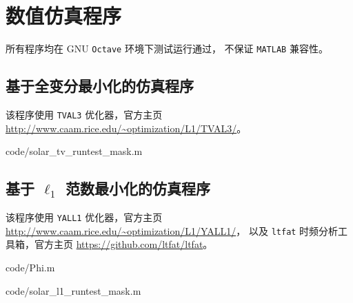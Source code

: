 \chapter{数值仿真程序}

所有程序均在 GNU \verb|Octave| 环境下测试运行通过，
不保证 \verb|MATLAB| 兼容性。

\section{基于全变分最小化的仿真程序}

该程序使用 \verb|TVAL3| 优化器，官方主页
\url{http://www.caam.rice.edu/~optimization/L1/TVAL3/}。

\lstset{basicstyle=\ttfamily}


{code/solar_tv_runtest_mask.m}

\section{基于 $\ell_1$ 范数最小化的仿真程序}

该程序使用 \verb|YALL1| 优化器，官方主页
\url{http://www.caam.rice.edu/~optimization/L1/YALL1/}，
以及 \verb|ltfat| 时频分析工具箱，官方主页
\url{https://github.com/ltfat/ltfat}。


{code/Phi.m}


{code/solar_l1_runtest_mask.m}
